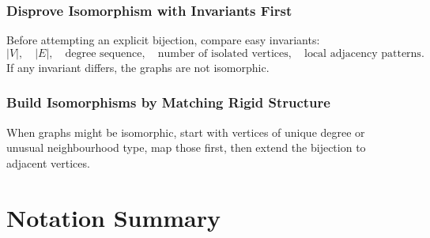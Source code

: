 \documentclass[12pt]{article}
\begin{document}
\subsubsection{Disprove Isomorphism with Invariants First}
Before attempting an explicit bijection, compare easy invariants:
\[
|V|,\quad |E|,\quad \text{degree sequence},\quad \text{number of isolated vertices},\quad \text{local adjacency patterns}.
\]
If any invariant differs, the graphs are not isomorphic.

\subsubsection{Build Isomorphisms by Matching Rigid Structure}
When graphs might be isomorphic, start with vertices of unique degree or unusual neighbourhood type, map those first, then extend the bijection to adjacent vertices.
\newpage
\section{Notation Summary}
\end{document}
